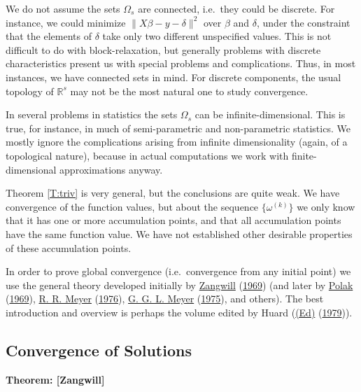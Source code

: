 \documentclass[
  12pt,
]{book}
\begin{document}
We do not assume the sets \(\Omega_s\) are connected, i.e.~they could be
discrete. For instance, we could minimize \(\|X\beta-y-\delta\|^2\)
over \(\beta\) and \(\delta\), under the constraint that the elements of \(\delta\) take only two different unspecified values.
This is not difficult to
do with block-relaxation, but generally problems with discrete
characteristics present us with special problems and complications.
Thus, in most instances, we have connected sets in mind. For discrete
components, the usual topology of \(\mathbb{R}^s\) may not be the most natural
one to study convergence.

In several problems in statistics the sets \(\Omega_s\) can be
infinite-dimensional. This is true, for instance, in much of semi-parametric
and non-parametric statistics. We mostly ignore the complications
arising from infinite dimensionality (again, of a topological nature),
because in actual computations we work with finite-dimensional
approximations anyway.

Theorem \ref{T:triv} is very general, but the conclusions are quite weak.
We have convergence of the function values, but about the
sequence \(\{\omega^{(k)}\}\) we only know that it has one or
more accumulation points, and that all accumulation points
have the same function value. We have not established other desirable properties of these accumulation points.

In order to prove global convergence (i.e.~convergence from
any initial point) we use the general theory
developed initially by \protect\hyperlink{ref-zangwill_69}{Zangwill} (\protect\hyperlink{ref-zangwill_69}{1969})
(and later by \protect\hyperlink{ref-polak_69}{Polak} (\protect\hyperlink{ref-polak_69}{1969}), \protect\hyperlink{ref-meyer_76}{R. R. Meyer} (\protect\hyperlink{ref-meyer_76}{1976}),
\protect\hyperlink{ref-meyer_75}{G. G. L. Meyer} (\protect\hyperlink{ref-meyer_75}{1975}), and others). The best introduction and overview
is perhaps the volume edited by Huard (\protect\hyperlink{ref-huard_79a}{(Ed)} (\protect\hyperlink{ref-huard_79a}{1979})).

\hypertarget{convergence-of-solutions}{%
\subsection{Convergence of Solutions}\label{convergence-of-solutions}}

\textbf{Theorem: {[}Zangwill{]}}
\end{document}
